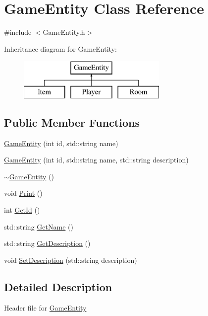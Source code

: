 \hypertarget{class_game_entity}{}\section{Game\+Entity Class Reference}
\label{class_game_entity}


{\ttfamily \#include $<$Game\+Entity.\+h$>$}

Inheritance diagram for Game\+Entity\+:\begin{figure}[H]
\begin{center}
\leavevmode
\includegraphics[height=2.000000cm]{class_game_entity}
\end{center}
\end{figure}
\subsection*{Public Member Functions}
\begin{DoxyCompactItemize}
\item 
\hyperlink{class_game_entity_ac534073fe3e7b25d95029c8af622a88e}{Game\+Entity} (int id, std\+::string name)
\item 
\hyperlink{class_game_entity_a941b5c3c653f7526545bd81816e9531a}{Game\+Entity} (int id, std\+::string name, std\+::string description)
\item 
\hyperlink{class_game_entity_a241238b29b5e440107a5b295edf24f9c}{$\sim$\+Game\+Entity} ()
\item 
void \hyperlink{class_game_entity_ac909a518389ee9bc92562b4166340766}{Print} ()
\item 
int \hyperlink{class_game_entity_ad20b660a4f851e9636fdfd15f0d44df0}{Get\+Id} ()
\item 
std\+::string \hyperlink{class_game_entity_ae45ee64de484dec1b16aea85171d9856}{Get\+Name} ()
\item 
std\+::string \hyperlink{class_game_entity_ac8da446a6c6990585b6581fe8537b7bf}{Get\+Description} ()
\item 
void \hyperlink{class_game_entity_a163f5785614921a65aab161491d8c47c}{Set\+Description} (std\+::string description)
\end{DoxyCompactItemize}


\subsection{Detailed Description}
Header file for \hyperlink{class_game_entity}{Game\+Entity} 

